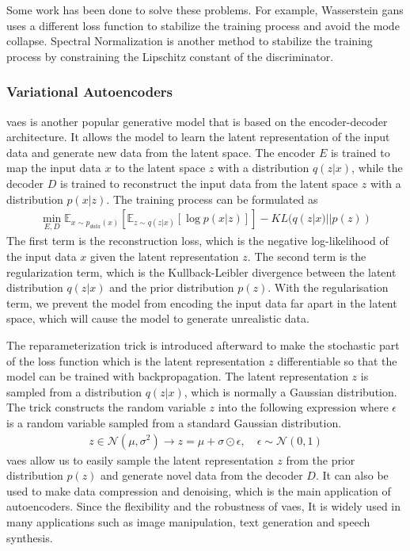 \documentclass[12pt,DIV14,BCOR12mm,a4paper,footinclude=false,headinclude,parskip=half-,twoside,openright,cleardoublepage=empty,toc=index,bibliography=totoc,listof=totoc]{scrreprt}
\numberwithin{equation}{chapter}
\begin{document}
Some work has been done to solve these problems. For example, Wasserstein \glspl{gan} \cite{arjovsky2017wasserstein} uses a different loss function to stabilize the training process and avoid the mode collapse. Spectral Normalization \cite{miyato2018spectral} is another method to stabilize the training process by constraining the Lipschitz constant of the discriminator.
\subsubsection{Variational Autoencoders}
\glspl{vae} \cite{kingma2022autoencoding} is another popular generative model that is based on the encoder-decoder architecture. It allows the model to learn the latent representation of the input data and generate new data from the latent space. The encoder $E$ is trained to map the input data $x$ to the latent space $z$ with a distribution $q(z|x)$, while the decoder $D$ is trained to reconstruct the input data from the latent space $z$ with a distribution $p(x|z)$. The training process can be formulated as
\begin{align}
  \min_{E,D} \mathbb{E}_{x\sim p_{data}(x)}[\mathbb{E}_{z\sim q(z|x)}[\log p(x|z)]] - KL(q(z|x)||p(z))
\end{align}
The first term is the reconstruction loss, which is the negative log-likelihood of the input data $x$ given the latent representation $z$. The second term is the regularization term, which is the Kullback-Leibler divergence between the latent distribution $q(z|x)$ and the prior distribution $p(z)$. With the regularisation term, we prevent the model from encoding the input data far apart in the latent space, which will cause the model to generate unrealistic data.

The reparameterization trick \cite{kingma2015variational} is introduced afterward to make the stochastic part of the loss function which is the latent representation $z$ differentiable so that the model can be trained with backpropagation. The latent representation $z$ is sampled from a distribution $q(z|x)$, which is normally a Gaussian distribution. The trick constructs the random variable $z$ into the following expression where $\epsilon$ is a random variable sampled from a standard Gaussian distribution.
\begin{align}
  z \in \mathcal{N} (\mu, \sigma^{2}) \longrightarrow z = \mu + \sigma \odot \epsilon, \quad \epsilon \sim \mathcal{N} (0, 1)
\end{align}
\glspl{vae} allow us to easily sample the latent representation $z$ from the prior distribution $p(z)$ and generate novel data from the decoder $D$. It can also be used to make data compression and denoising, which is the main application of autoencoders. Since the flexibility and the robustness of \glspl{vae}, It is widely used in many applications such as image manipulation, text generation and speech synthesis.
\end{document}
